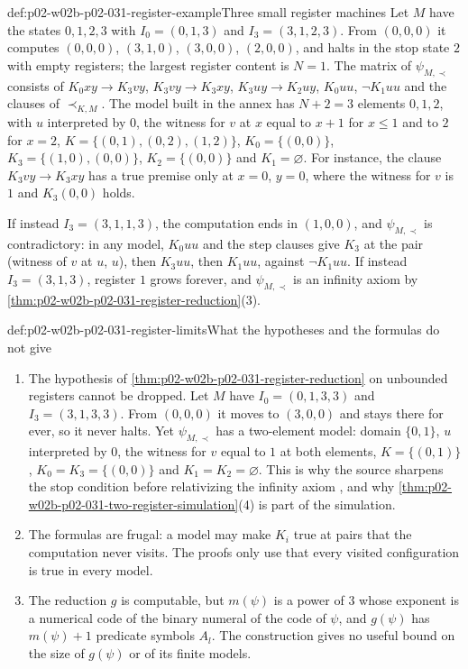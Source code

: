 \begin{hbexample}{def:p02-w02b-p02-031-register-example}{Three small register machines}
Let \(M\) have the states \(0,1,2,3\) with \(I_0=(0,1,3)\) and
\(I_3=(3,1,2,3)\).  From \((0,0,0)\) it computes \((0,0,0)\), \((3,1,0)\),
\((3,0,0)\), \((2,0,0)\), and halts in the stop state \(2\) with empty
registers; the largest register content is \(N=1\).  The matrix of
\(\psi_{M,\prec}\) consists of \(K_0xy\to K_3vy\), \(K_3vy\to K_3xy\),
\(K_3uy\to K_2uy\), \(K_0uu\), \(\neg K_1uu\) and the clauses of
\(\prec_{K,M}\).  The model built in the annex has \(N+2=3\) elements
\(0,1,2\), with \(u\) interpreted by \(0\), the witness for \(v\) at \(x\)
equal to \(x+1\) for \(x\leq1\) and to \(2\) for \(x=2\),
\(K=\{(0,1),(0,2),(1,2)\}\), \(K_0=\{(0,0)\}\), \(K_3=\{(1,0),(0,0)\}\),
\(K_2=\{(0,0)\}\) and \(K_1=\varnothing\).  For instance, the clause
\(K_3vy\to K_3xy\) has a true premise only at \(x=0\), \(y=0\), where the
witness for \(v\) is \(1\) and \(K_3(0,0)\) holds.

If instead \(I_3=(3,1,1,3)\), the computation ends in \((1,0,0)\), and
\(\psi_{M,\prec}\) is contradictory: in any model, \(K_0uu\) and the step
clauses give \(K_3\) at the pair (witness of \(v\) at \(u\), \(u\)), then
\(K_3uu\), then \(K_1uu\), against \(\neg K_1uu\).  If instead
\(I_3=(3,1,3)\), register \(1\) grows forever, and \(\psi_{M,\prec}\) is an
infinity axiom by \cref{thm:p02-w02b-p02-031-register-reduction}(3).
\end{hbexample}

\begin{hbwarning}{def:p02-w02b-p02-031-register-limits}{What the hypotheses and the formulas do not give}
\begin{enumerate}
\item The hypothesis of \cref{thm:p02-w02b-p02-031-register-reduction} on
  unbounded registers cannot be dropped.  Let \(M\) have
  \(I_0=(0,1,3,3)\) and \(I_3=(3,1,3,3)\).  From \((0,0,0)\) it moves to
  \((3,0,0)\) and stays there for ever, so it never halts.  Yet
  \(\psi_{M,\prec}\) has a two-element model: domain \(\{0,1\}\), \(u\)
  interpreted by \(0\), the witness for \(v\) equal to \(1\) at both
  elements, \(K=\{(0,1)\}\), \(K_0=K_3=\{(0,0)\}\) and \(K_1=K_2=\varnothing\).
  This is why the source sharpens the stop condition before relativizing the
  infinity axiom \cite[Sect.~2.1.2, p.~35]{BorgerGradelGurevich1997}, and why
  \cref{thm:p02-w02b-p02-031-two-register-simulation}(4) is part of the
  simulation.
\item The formulas are frugal: a model may make \(K_i\) true at pairs that the
  computation never visits.  The proofs only use that every visited
  configuration is true in every model.
\item The reduction \(g\) is computable, but \(m(\psi)\) is a power of \(3\)
  whose exponent is a numerical code of the binary numeral of the code of
  \(\psi\), and \(g(\psi)\) has \(m(\psi)+1\) predicate symbols \(A_l\).  The
  construction gives no useful bound on the size of \(g(\psi)\) or of its
  finite models.
\end{enumerate}
\end{hbwarning}

